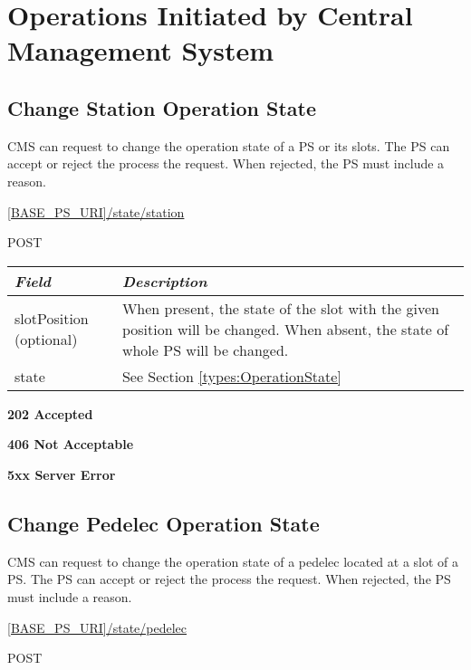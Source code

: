 \section{Operations Initiated by Central Management System}

\subsection{Change Station Operation State}

\acs{CMS} can request to change the operation state of a \acs{PS} or its slots. The \acs{PS} can accept or reject the process the request. When rejected, the \acs{PS} must include a reason.

 \url{[BASE_PS_URI]/state/station}

 POST

\begin{table}[!h]
\vspace{-7mm}
\begin{tabularx}{\linewidth}{ | l | X | }
  \hline
  \textit{Field} & \textit{Description} \\
  \hline \hline
  slotPosition (optional) 		& When present, the state of the slot with the given position will be changed. When absent, the state of whole \acs{PS} will be changed. \\
  state 					& See Section \ref{types:OperationState} \\
    \hline
\end{tabularx}
\end{table}

 \textbf{202 Accepted}

 \textbf{406 Not Acceptable}

\textbf{5xx Server Error}

\subsection{Change Pedelec Operation State}

\acs{CMS} can request to change the operation state of a pedelec located at a slot of a \acs{PS}. The \acs{PS} can accept or reject the process the request. When rejected, the \acs{PS} must include a reason.

 \url{[BASE_PS_URI]/state/pedelec}

 POST

